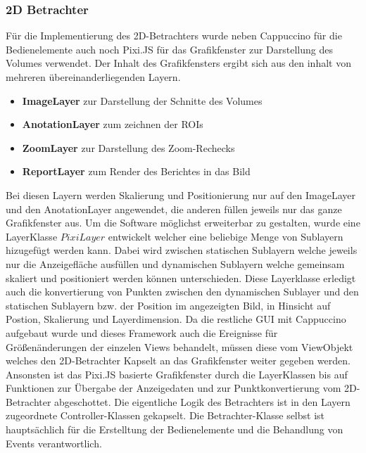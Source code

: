 \subsubsection{2D Betrachter}
\label{sec:2D Betrachter}
Für die Implementierung des 2D-Betrachters wurde neben Cappuccino für die Bedienelemente auch noch Pixi.JS für das Grafikfenster zur Darstellung des Volumes verwendet.
Der Inhalt des Grafikfensters ergibt sich aus den inhalt von mehreren übereinanderliegenden Layern.
\begin{itemize}
	\item \textbf{ImageLayer} zur Darstellung der Schnitte des Volumes
	\item \textbf{AnotationLayer} zum zeichnen der ROIs
	\item \textbf{ZoomLayer} zur Darstellung des Zoom-Rechecks
	\item \textbf{ReportLayer} zum Render des Berichtes in das Bild
\end{itemize}
Bei diesen Layern werden Skalierung und Positionierung nur auf den ImageLayer und den AnotationLayer angewendet, die anderen füllen jeweils nur das ganze Grafikfenster aus.
Um die Software möglichst erweiterbar zu gestalten,
wurde eine LayerKlasse $PixiLayer$ entwickelt welcher eine beliebige Menge von Sublayern hizugefügt werden kann.
Dabei wird zwischen statischen Sublayern welche jeweils nur die Anzeigefläche ausfüllen und dynamischen Sublayern welche gemeinsam skaliert und positioniert werden können unterschieden.
Diese Layerklasse erledigt auch die konvertierung von Punkten zwischen den dynamischen Sublayer und den statischen Sublayern bzw. der Position im angezeigten Bild, in Hinsicht auf Postion, Skalierung und Layerdimension.
Da die restliche GUI mit Cappuccino aufgebaut wurde und dieses Framework auch die Ereignisse für Größenänderungen der einzelen Views behandelt,
müssen diese vom ViewObjekt welches den 2D-Betrachter Kapselt an das Grafikfenster weiter gegeben werden.
Ansonsten ist das Pixi.JS basierte Grafikfenster durch die LayerKlassen bis auf Funktionen zur Übergabe der Anzeigedaten und zur Punktkonvertierung vom 2D-Betrachter abgeschottet.
Die eigentliche Logik des Betrachters ist in den Layern zugeordnete Controller-Klassen gekapselt.
Die Betrachter-Klasse selbst ist hauptsächlich für die Erstelltung der Bedienelemente und die Behandlung von Events verantwortlich.
